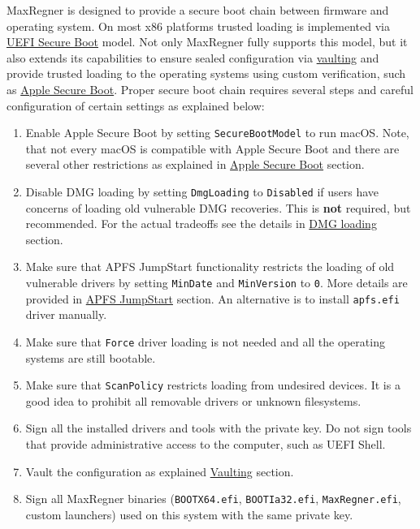 \documentclass[]{article}
\begin{document}
MaxRegner is designed to provide a secure boot chain between firmware
and operating system. On most x86 platforms trusted loading is implemented
via \href{https://en.wikipedia.org/wiki/UEFI_Secure_Boot}{UEFI Secure Boot} model.
Not only MaxRegner fully supports this model, but it also extends its capabilities
to ensure sealed configuration via \hyperref[securevaulting]{vaulting} and
provide trusted loading to the operating systems using custom verification,
such as \hyperref[secureapplesb]{Apple Secure Boot}. Proper secure boot chain
requires several steps and careful configuration of certain settings as explained below:

\begin{enumerate}
\item Enable Apple Secure Boot by setting \texttt{SecureBootModel} to
  run macOS. Note, that not every macOS is compatible with Apple Secure Boot and
  there are several other restrictions as explained in
  \hyperref[secureapplesb]{Apple Secure Boot} section.
\item Disable DMG loading by setting \texttt{DmgLoading} to \texttt{Disabled}
  if users have concerns of loading old vulnerable DMG recoveries. This is
  \textbf{not} required, but recommended. For the actual tradeoffs
  see the details in \hyperref[securedmgloading]{DMG loading} section.
\item Make sure that APFS JumpStart functionality restricts the loading
  of old vulnerable drivers by setting \texttt{MinDate} and \texttt{MinVersion}
  to \texttt{0}. More details are provided in \hyperref[uefiapfsprops]{APFS JumpStart}
  section. An alternative is to install \texttt{apfs.efi} driver manually.
\item Make sure that \texttt{Force} driver loading is not needed and
  all the operating systems are still bootable.
\item Make sure that \texttt{ScanPolicy} restricts loading from undesired
  devices. It is a good idea to prohibit all removable drivers or unknown
  filesystems.
\item Sign all the installed drivers and tools with the private key. Do not sign
  tools that provide administrative access to the computer, such as UEFI Shell.
\item Vault the configuration as explained \hyperref[securevaulting]{Vaulting}
  section.
\item Sign all MaxRegner binaries (\texttt{BOOTX64.efi}, \texttt{BOOTIa32.efi},
  \texttt{MaxRegner.efi}, custom launchers) used on this system with
  the same private key.

\end{enumerate}
\end{document}
